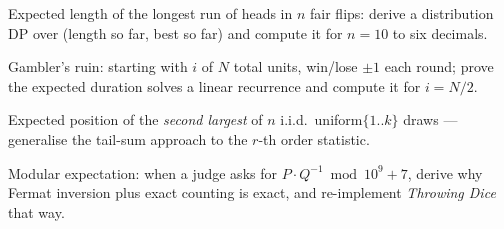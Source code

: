 \begin{exercise}[hard] Expected length of the longest run of heads in $n$ fair flips: derive a distribution DP over (length so far, best so far) and compute it for $n=10$ to six decimals. \end{exercise}
\begin{exercise}[hard] Gambler's ruin: starting with $i$ of $N$ total units, win/lose $\pm1$ each round; prove the expected duration solves a linear recurrence and compute it for $i=N/2$. \end{exercise}
\begin{exercise}[hard] Expected position of the \emph{second largest} of $n$ i.i.d.\ uniform$\{1..k\}$ draws --- generalise the tail-sum approach to the $r$-th order statistic. \end{exercise}
\begin{exercise}[hard] Modular expectation: when a judge asks for $P\cdot Q^{-1}\bmod 10^9+7$, derive why Fermat inversion plus exact counting is exact, and re-implement \emph{Throwing Dice} that way. \end{exercise}

\chapternotes

